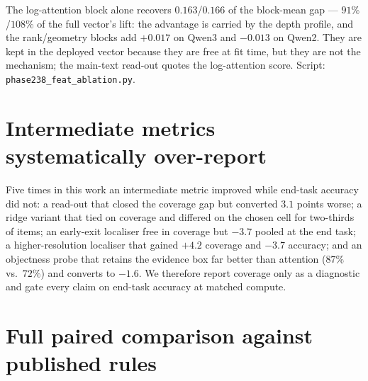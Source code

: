 The log-attention block alone recovers $0.163$/$0.166$ of the block-mean gap --- $91\%$/$108\%$ of the full
vector's lift: the advantage is carried by the depth profile, and the rank/geometry blocks add $+0.017$ on
Qwen3 and $-0.013$ on Qwen2. They are kept in the deployed vector because they are free at fit time, but they
are not the mechanism; the main-text read-out quotes the log-attention score. Script:
\texttt{phase238\_feat\_ablation.py}.

\section{Intermediate metrics systematically over-report}\label{app:proxy}

Five times in this work an intermediate metric improved while end-task accuracy did not: a read-out that closed the
coverage gap but converted $3.1$ points worse; a ridge variant that tied on coverage and differed on the chosen cell
for two-thirds of items; an early-exit localiser free in coverage but $-3.7$ pooled at the end task; a
higher-resolution localiser that gained $+4.2$ coverage and $-3.7$ accuracy; and an objectness probe that retains the
evidence box far better than attention ($87\%$ vs.\ $72\%$) and converts to $-1.6$. We therefore report coverage only
as a diagnostic and gate every claim on end-task accuracy at matched compute.




\section{Full paired comparison against published rules}\label{app:paired}

